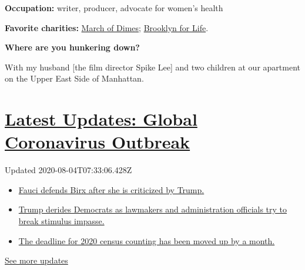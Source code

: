 \textbf{Occupation:} writer, producer, advocate for women's health

\textbf{Favorite charities:}
\href{https://www.marchofdimes.org/giving/support-general.aspx?\&utm_source=google\&utm_medium=cpc\&utm_campaign=alwayson\&utm_content=nonbrand\&utm_term=march\%20of\%20dimes\%20website\&DonationTrackingParam1=alwayson_google\&gclid=EAIaIQobChMI7oXbnKXF6QIVA4vICh1rKA6bEAAYASAAEgJDSPD_BwE\&gclsrc=aw.ds}{March
of Dimes}; \href{https://www.brooklynforlife.org}{Brooklyn for Life}.

\textbf{Where are you hunkering down?}

With my husband {[}the film director Spike Lee{]} and two children at
our apartment on the Upper East Side of Manhattan.

\hypertarget{latest-updates-global-coronavirus-outbreak}{%
\section{\texorpdfstring{\href{https://www.nytimes.com/2020/08/03/world/coronavirus-covid-19.html?action=click\&pgtype=Article\&state=default\&region=MAIN_CONTENT_1\&context=storylines_live_updates}{Latest
Updates: Global Coronavirus
Outbreak}}{Latest Updates: Global Coronavirus Outbreak}}\label{latest-updates-global-coronavirus-outbreak}}

Updated 2020-08-04T07:33:06.428Z

\begin{itemize}
\tightlist
\item
  \href{https://www.nytimes.com/2020/08/03/world/coronavirus-covid-19.html?action=click\&pgtype=Article\&state=default\&region=MAIN_CONTENT_1\&context=storylines_live_updates\#link-4547638f}{Fauci
  defends Birx after she is criticized by Trump.}
\item
  \href{https://www.nytimes.com/2020/08/03/world/coronavirus-covid-19.html?action=click\&pgtype=Article\&state=default\&region=MAIN_CONTENT_1\&context=storylines_live_updates\#link-15e7f995}{Trump
  derides Democrats as lawmakers and administration officials try to
  break stimulus impasse.}
\item
  \href{https://www.nytimes.com/2020/08/03/world/coronavirus-covid-19.html?action=click\&pgtype=Article\&state=default\&region=MAIN_CONTENT_1\&context=storylines_live_updates\#link-e5a2cda}{The
  deadline for 2020 census counting has been moved up by a month.}
\end{itemize}

\href{https://www.nytimes.com/2020/08/03/world/coronavirus-covid-19.html?action=click\&pgtype=Article\&state=default\&region=MAIN_CONTENT_1\&context=storylines_live_updates}{See
more updates}

